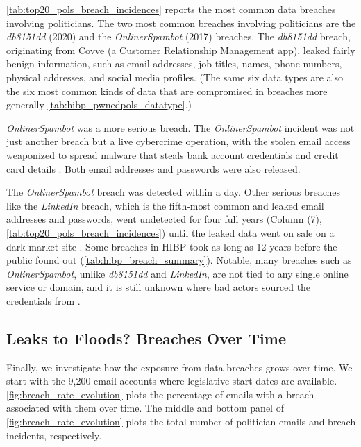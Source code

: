 \documentclass[12pt, letterpaper]{article}
\begin{document}


\cref{tab:top20_pols_breach_incidences} reports the most common data breaches involving politicians. The two most common breaches involving politicians are the \textit{db8151dd} (2020) and the \textit{OnlinerSpambot} (2017) breaches. The \textit{db8151dd} breach, originating from Covve (a Customer Relationship Management app), leaked fairly benign information, such as email addresses, job titles, names, phone numbers, physical addresses, and social media profiles. (The same six data types are also the six most common kinds of data that are compromised in breaches more generally \cref{tab:hibp_pwnedpols_datatype}.)

\textit{OnlinerSpambot} was a more serious breach. The \textit{OnlinerSpambot} incident was not just another breach but a live cybercrime operation, with the stolen email access weaponized to spread malware that steals bank account credentials and credit card details \citep{Hayashi2017, bbc2017onliner, trendmicro2017onliner, HIBP}. Both email addresses and passwords were also released.

The \textit{OnlinerSpambot} breach was detected within a day. Other serious breaches like the \textit{LinkedIn} breach, which is the fifth-most common and leaked email addresses and passwords, went undetected for four full years (Column (7), \cref{tab:top20_pols_breach_incidences}) until the leaked data went on sale on a dark market site \citep{HIBP}. Some breaches in HIBP took as long as 12 years before the public found out (\cref{tab:hibp_breach_summary}). Notable, many breaches such as \textit{OnlinerSpambot}, unlike \textit{db8151dd} and \textit{LinkedIn}, are not tied to any single online service or domain, and it is still unknown where bad actors sourced the credentials from \citep{bbc2017onliner, trendmicro2017onliner, HIBP}.

\subsection{Leaks to Floods? Breaches Over Time}

Finally, we investigate how the exposure from data breaches grows over time. We start with the 9,200 email accounts where legislative start dates are available. \cref{fig:breach_rate_evolution} plots the percentage of emails with a breach associated with them over time. The middle and bottom panel of \cref{fig:breach_rate_evolution} plots the total number of politician emails and breach incidents, respectively. 
\end{document}
